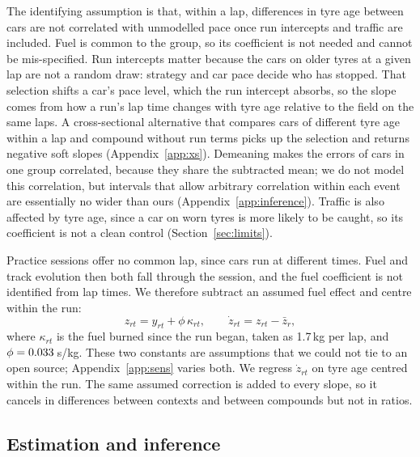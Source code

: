 The identifying assumption is that, within a lap, differences in tyre age between cars are not correlated with unmodelled pace once run intercepts and traffic are included.
Fuel is common to the group, so its coefficient is not needed and cannot be mis-specified.
Run intercepts matter because the cars on older tyres at a given lap are not a random draw: strategy and car pace decide who has stopped.
That selection shifts a car's pace level, which the run intercept absorbs, so the slope comes from how a run's lap time changes with tyre age relative to the field on the same laps.
A cross-sectional alternative that compares cars of different tyre age within a lap and compound without run terms picks up the selection and returns negative soft slopes (Appendix~\ref{app:xs}).
Demeaning makes the errors of cars in one group correlated, because they share the subtracted mean; we do not model this correlation, but intervals that allow arbitrary correlation within each event are essentially no wider than ours (Appendix~\ref{app:inference}).
Traffic is also affected by tyre age, since a car on worn tyres is more likely to be caught, so its coefficient is not a clean control (Section~\ref{sec:limits}).

Practice sessions offer no common lap, since cars run at different times.
Fuel and track evolution then both fall through the session, and the fuel coefficient is not identified from lap times.
We therefore subtract an assumed fuel effect and centre within the run:
\begin{equation}\label{eq:practice}
  z_{rt} = y_{rt} + \phi\,\kappa_{rt}, \qquad \dot z_{rt} = z_{rt}-\bar z_{r},
\end{equation}
where $\kappa_{rt}$ is the fuel burned since the run began, taken as 1.7\,kg per lap, and $\phi=0.033$\,s/kg.
These two constants are assumptions that we could not tie to an open source; Appendix~\ref{app:sens} varies both.
We regress $\dot z_{rt}$ on tyre age centred within the run.
The same assumed correction is added to every slope, so it cancels in differences between contexts and between compounds but not in ratios.

\subsection{Estimation and inference}\label{sec:mixed}

